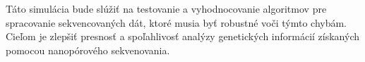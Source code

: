 Táto simulácia bude slúžiť na testovanie a vyhodnocovanie algoritmov pre spracovanie sekvencovaných dát, ktoré musia byť robustné voči týmto chybám. Cieľom je zlepšiť presnosť a spoľahlivosť analýzy genetických informácií získaných pomocou nanopórového sekvenovania.
